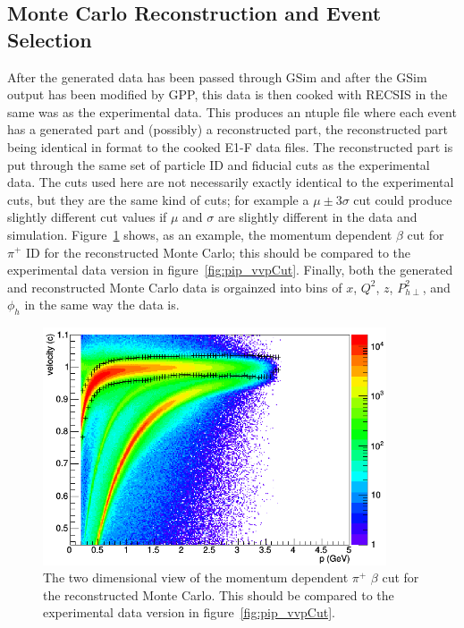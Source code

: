 \subsection{Monte Carlo Reconstruction and Event Selection}
\label{subsec:ReconstructionAndEventSelection}
%
After the generated data has been passed through GSim and after the GSim output has been modified by GPP, this data is then cooked with RECSIS in the same was as the experimental data.
This produces an ntuple file where each event has a generated part and (possibly) a reconstructed part, the reconstructed part being identical in format to the cooked E1-F data files.
The reconstructed part is put through the same set of particle ID and fiducial cuts as the experimental data.
The cuts used here are not necessarily exactly identical to the experimental cuts, but they are the same kind of cuts; for example a $\mu \pm 3\sigma$ cut could produce slightly different cut values if $\mu$ and $\sigma$ are slightly different in the data and simulation.
Figure~\ref{fig:MC_pip_vvpCut} shows, as an example, the momentum dependent $\beta$ cut for $\pi^+$ ID for the reconstructed Monte Carlo; this should be compared to the experimental data version in figure~\ref{fig:pip_vvpCut}.
Finally, both the generated and reconstructed Monte Carlo data is orgainzed into bins of $x$, $Q^2$, $z$, $P_{h\perp}^2$, and $\phi_h$ in the same way the data is.
%
\begin{figure}[htp]
\centering
\includegraphics[width=4in]{figures/MC_pip_vvpCut.png}
\caption{The two dimensional view of the momentum dependent $\pi^+$ $\beta$ cut for the reconstructed Monte Carlo. This should be compared to the experimental data version in figure~\ref{fig:pip_vvpCut}.}
\label{fig:MC_pip_vvpCut}
\end{figure}
%
%

